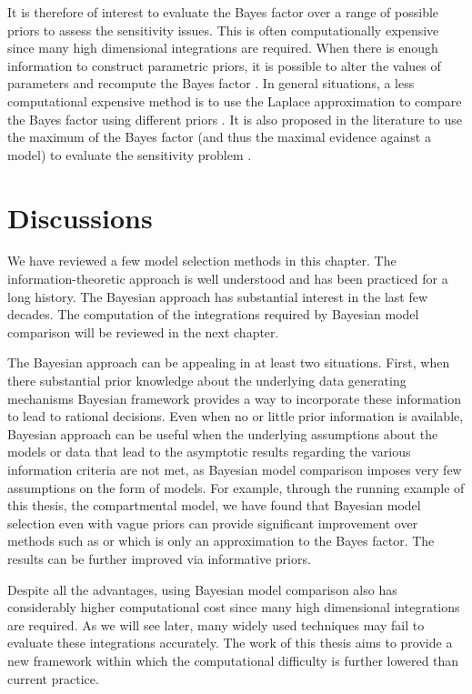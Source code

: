 It is therefore of interest to evaluate the Bayes factor over a range of possible priors to assess the sensitivity issues. This is often computationally expensive since many high dimensional integrations are required. When there is enough information to construct parametric priors, it is possible to alter the values of parameters and recompute the Bayes factor \cite{McCulloch:1991hj}. In general situations, a less computational expensive method is to use the Laplace approximation to compare the Bayes factor using different priors \cite{Kass:1992tz}. It is also proposed in the literature to use the maximum of the Bayes factor (and thus the maximal evidence against a model) to evaluate the sensitivity problem \cite{Berger:1987iq}.

\section{Discussions}
\label{sec:Model Selection Discussion}

We have reviewed a few model selection methods in this chapter. The information-theoretic approach is well understood and has been practiced for a long history. The Bayesian approach has  substantial interest in the last few decades. The computation of the integrations required by Bayesian model comparison will be reviewed in the next chapter.

The Bayesian approach can be appealing in at least two situations. First, when there  substantial prior knowledge about the underlying data generating mechanisms Bayesian framework provides a way to incorporate these information to lead to rational decisions. Even when no or little prior information is available,  Bayesian approach can be useful when the underlying assumptions about the models or data that lead to the asymptotic results regarding the various information criteria are not met, as Bayesian model comparison imposes very few assumptions on the form of models. For example, through the running example of this thesis, the \pet compartmental model, we have found that Bayesian model selection even with vague priors can provide significant improvement over methods such as \aicc or \bic which is only an approximation to the Bayes factor. The results can be further improved via informative priors.

Despite all the advantages, using Bayesian model comparison also has considerably higher computational cost since many high dimensional integrations are required. As we will see later, many widely used techniques may fail to evaluate these integrations accurately. The work of this thesis aims to provide a new framework within which the computational difficulty is further lowered than current practice.

